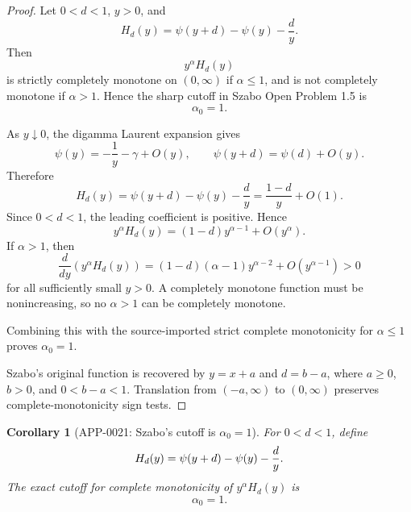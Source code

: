 \documentclass[11pt]{article}
\numberwithin{equation}{section}
\newtheorem{corollary}[theorem]{Corollary}
\theoremstyle{definition}
\theoremstyle{remark}
\newcommand{\1}{\mathbf 1}
\begin{document}
\begin{proof}
Let \(0<d<1\), \(y>0\), and
\[
H_d(y)=\psi(y+d)-\psi(y)-\frac{d}{y}.
\]
Then
\[
y^\alpha H_d(y)
\]
is strictly completely monotone on \((0,\infty)\) if \(\alpha\le 1\), and is not completely monotone if \(\alpha>1\). Hence the sharp cutoff in Szabo Open Problem 1.5 is
\[
\alpha_0=1.
\]

As \(y\downarrow0\), the digamma Laurent expansion gives
\[
\psi(y)=-\frac1y-\gamma+O(y),
\qquad
\psi(y+d)=\psi(d)+O(y).
\]
Therefore
\[
H_d(y)=\psi(y+d)-\psi(y)-\frac{d}{y}
=\frac{1-d}{y}+O(1).
\]
Since \(0<d<1\), the leading coefficient is positive. Hence
\[
y^\alpha H_d(y)=(1-d)y^{\alpha-1}+O(y^\alpha).
\]
If \(\alpha>1\), then
\[
\frac{d}{dy}\left(y^\alpha H_d(y)\right)
=(1-d)(\alpha-1)y^{\alpha-2}+O(y^{\alpha-1})>0
\]
for all sufficiently small \(y>0\). A completely monotone function must be nonincreasing, so no \(\alpha>1\) can be completely monotone.

Combining this with the source-imported strict complete monotonicity for \(\alpha\le1\) proves \(\alpha_0=1\).

Szabo's original function is recovered by \(y=x+a\) and \(d=b-a\), where \(a\ge0\), \(b>0\), and \(0<b-a<1\). Translation from \((-a,\infty)\) to \((0,\infty)\) preserves complete-monotonicity sign tests.
\end{proof}

\begin{corollary}[APP-0021: Szabo's cutoff is \(\alpha_0=1\)]
\label{thm:app21-szabo-cutoff}
For \(0<d<1\), define
\[
  H_d(y)=\psi(y+d)-\psi(y)-{d\over y}.
\]
The exact cutoff for complete monotonicity of \(y^\alpha H_d(y)\) is
\[
  \alpha_0=1 .
\]


\end{corollary}
\end{document}
